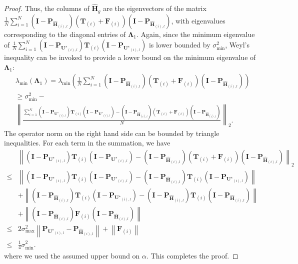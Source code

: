 \documentclass[twoside,11pt]{article}
\newcommand{\norm}[1]{\left\lVert#1\right\rVert}
\newcommand{\matF}{\mathbf{F}}
\newcommand{\hmatH}{{\hat{\mathbf{H}}}{}}
\newcommand{\matI}{\mathbf{I}}
\newcommand{\matP}{\mathbf{P}}
\newcommand{\matT}{\mathbf{T}}
\newcommand{\matLambda}{\mathbf{\Lambda}}
\newcommand{\matUst}{{\mathbf{U}^\star}}
\newcommand{\gop}{\sigma_{\max}}
\newcommand{\sms}{\sigma_{\min}^2}
\begin{document}
\begin{proof}
Thus, the columns of $\hmatH_g$ are the eigenvectors of the matrix $\frac{1}{N}\sum_{i=1}^N\left(\matI-\matP_{\hmatH_{(i),l}}\right)\left(\matT_{(i)}+\matF_{(i)}\right)\left(\matI-\matP_{\hmatH_{(i),l}}\right)$, with eigenvalues corresponding to the diagonal entries of $\matLambda_1$. Again, since the minimum eigenvalue of $\frac{1}{N}\sum_{i=1}^N\left(\matI-\matP_{\matUst_{(i),l}}\right)\matT_{(i)}\left(\matI-\matP_{\matUst_{(i),l}}\right)$ is lower bounded by $\sms$, Weyl's inequality can be invoked to provide a lower bound on the minimum eigenvalue of $\matLambda_1$:
$$
\begin{aligned}
&\lambda_{\min}\left(\matLambda_{1}\right)=\lambda_{\min}\left(\frac{1}{N}\sum_{i=1}^N\left(\matI-\matP_{\hmatH_{(i),l}}\right)\left(\matT_{(i)}+\matF_{(i)}\right)\left(\matI-\matP_{\hmatH_{(i),l}}\right)\right)\\
&\ge \sms-\\
&\norm{\frac{\sum_{i=1}^N\left(\matI-\matP_{\matUst_{(i),l}}\right)\matT_{(i)}\left(\matI-\matP_{\matUst_{(i),l}}\right)-\left(\matI-\matP_{\hmatH_{(i),l}}\right)\left(\matT_{(i)}+\matF_{(i)}\right)\left(\matI-\matP_{\hmatH_{(i),l}}\right)}{N}  }_2.  \end{aligned}
$$
The operator norm on the right hand side can be bounded by triangle inequalities. For each term in the summation, we have
$$
\begin{aligned}
&\norm{\left(\matI-\matP_{\matUst_{(i),l}}\right)\matT_{(i)}\left(\matI-\matP_{\matUst_{(i),l}}\right)-\left(\matI-\matP_{\hmatH_{(i),l}}\right)\left(\matT_{(i)}+\matF_{(i)}\right)\left(\matI-\matP_{\hmatH_{(i),l}}\right)}_2\\
\le& \norm{\left(\matI-\matP_{\matUst_{(i),l}}\right)\matT_{(i)}\left(\matI-\matP_{\matUst_{(i),l}}\right)-\left(\matI-\matP_{\hmatH_{(i),l}}\right)\matT_{(i)}\left(\matI-\matP_{\matUst_{(i),l}}\right)}\\
&+\norm{\left(\matI-\matP_{\hmatH_{(i),l}}\right)\matT_{(i)}\left(\matI-\matP_{\matUst_{(i),l}}\right)-\left(\matI-\matP_{\hmatH_{(i),l}}\right)\matT_{(i)}\left(\matI-\matP_{\hmatH_{(i),l}}\right)}\\
&+\norm{\left(\matI-\matP_{\hmatH_{(i),l}}\right)\matF_{(i)}\left(\matI-\matP_{\hmatH_{(i),l}}\right)}\\
\le& 2\gop^2\norm{\matP_{\matUst_{(i),l}}-\matP_{\hmatH_{(i),l}}}+\norm{\matF_{(i)}}\\
\le& \frac{1}{4}\sms.
\end{aligned}
$$
where we used the assumed upper bound on $\alpha$.
This completes the proof.
\end{proof}
\end{document}
